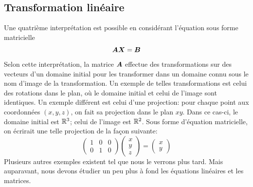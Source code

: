\subsection{Transformation linéaire}
Une quatrième interprétation est possible en considérant l'équation sous forme matricielle
\[
\boldsymbol{A} \boldsymbol{X} = \boldsymbol{B}
\]
Selon cette interprétation, la matrice $\boldsymbol{A}$ effectue des transformations sur des vecteurs d'un domaine initial pour les transformer dans un domaine connu sous le nom d'image de la transformation.  
Un exemple de telles transformations est celui des rotations dans le plan, où le domaine initial et celui de l'image sont identiques.  
Un exemple différent est celui d'une projection: pour chaque point aux coordonnées $(x, y, z)$, on fait sa projection dans le plan $xy$.  Dans ce cas-ci, le domaine initial est $\mathbb{R}^3$; celui de l'image est $\mathbb{R}^2$. 
Sous forme d'équation matricielle, on écrirait une 
telle projection de la façon suivante:
\[
\begin{pmatrix}
1 & 0 & 0 \\
0 & 1 & 0
\end{pmatrix}
\begin{pmatrix}
x\\y\\z
\end{pmatrix}
=
\begin{pmatrix}
x\\y
\end{pmatrix}
\]
Plusieurs autres exemples existent tel que nous le verrons plus tard.  Mais auparavant, nous devons étudier un peu plus à fond les équations linéaires et les matrices.
